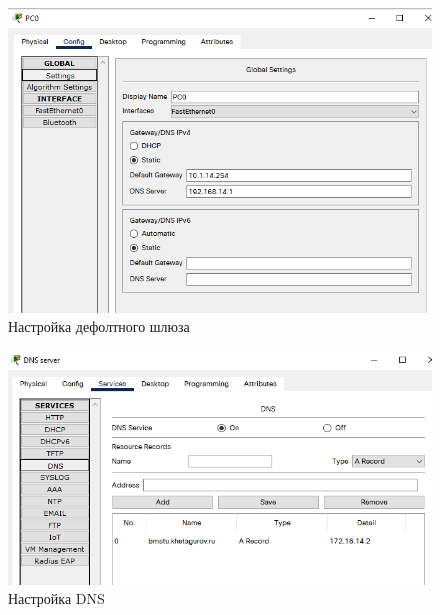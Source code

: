 \documentclass[12pt, a4paper]{extarticle}
\begin{document}
\begin{figure}[H]
	\centering
	\includegraphics[scale=0.7]{images/pc2.png}
	\caption{Настройка дефолтного шлюза}
\end{figure}

\begin{figure}[H]
	\centering
	\includegraphics[scale=0.7]{images/dns.png}
	\caption{Настройка DNS}
\end{figure}
\end{document}
